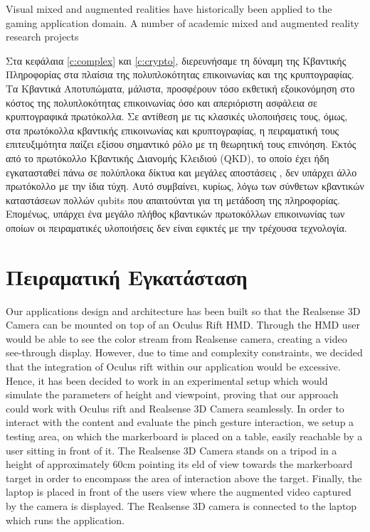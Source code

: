 

 \label{c:exper}

Visual mixed and augmented realities have historically been applied to the gaming application domain. A number of academic mixed and augmented reality
research projects

Στα κεφάλαια \ref{c:complex} και \ref{c:crypto}, διερευνήσαμε τη δύναμη της Κβαντικής Πληροφορίας στα πλαίσια της πολυπλοκότητας επικοινωνίας και της κρυπτογραφίας. Τα Κβαντικά Αποτυπώματα, μάλιστα, προσφέρουν τόσο εκθετική εξοικονόμηση στο κόστος της πολυπλοκότητας επικοινωνίας όσο και απεριόριστη ασφάλεια σε κρυπτογραφικά πρωτόκολλα. Σε αντίθεση με τις κλασικές υλοποιήσεις τους, όμως, στα πρωτόκολλα κβαντικής επικοινωνίας και κρυπτογραφίας, η πειραματική τους επιτευξιμότητα παίζει εξίσου σημαντικό ρόλο με τη θεωρητική τους επινόηση. Εκτός από το πρωτόκολλο Κβαντικής Διανομής Κλειδιού (QKD), το οποίο έχει ήδη εγκατασταθεί πάνω σε πολύπλοκα δίκτυα και μεγάλες αποστάσεις \cite{QKDexp1,QKDexp2}, δεν υπάρχει άλλο πρωτόκολλο με την ίδια τύχη. Αυτό συμβαίνει, κυρίως, λόγω των σύνθετων κβαντικών καταστάσεων πολλών qubits που απαιτούνται για τη μετάδοση της πληροφορίας. Επομένως, υπάρχει ένα μεγάλο πλήθος κβαντικών πρωτοκόλλων επικοινωνίας των οποίων οι πειραματικές υλοποιήσεις δεν είναι εφικτές με την τρέχουσα τεχνολογία.




\section{Πειραματική Εγκατάσταση}

Our applications design and architecture has been built so that the Realsense 3D Camera can be mounted on top of an Oculus Rift HMD. Through the HMD user would be able to see the color stream from Realsense camera, creating a video see-through display. However, due to time and complexity constraints, we decided that the integration of Oculus rift within our application would be excessive. Hence, it has been decided to work in an experimental setup which would simulate the parameters of height and viewpoint, proving that our approach could work with Oculus rift and Realsense 3D Camera seamlessly. In order to interact with the content and evaluate the pinch gesture interaction, we setup a testing area, on which the markerboard is placed on a table, easily reachable by a user sitting in front of it. The Realsense 3D Camera stands on a tripod in a height of approximately 60cm pointing its eld of view towards the markerboard target in order to encompass the area of interaction above the target. Finally, the laptop is placed in front of the users view where the augmented video captured by the camera is displayed. The Realsense 3D camera is connected to the laptop which runs the application.


